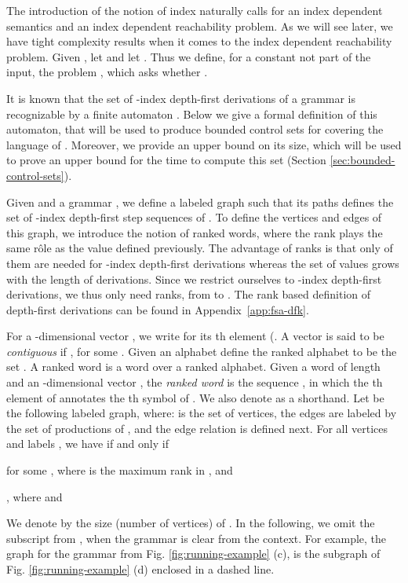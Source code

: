 \documentclass[final]{llncs}
\begin{document}
The introduction of the notion of index naturally calls for an index
dependent semantics and an index dependent reachability problem. As we
will see later, we have tight complexity results when it comes to the
index dependent reachability problem. Given ,
let 
and let . Thus we define, for a constant 
not part of the input, the
problem , which asks
whether .


It is known that the set of -index depth-first derivations of a
grammar  is recognizable by a finite
automaton \cite[Lemma~5]{Luker80}. Below we give a formal definition of this
automaton, that will be used to produce bounded control sets for
covering the language of . Moreover, we provide an upper bound on
its size, which will be used to prove an upper bound for the time
to compute this set (Section \ref{sec:bounded-control-sets}).

Given  and a grammar , we define a
labeled graph  such that its paths defines the set of
-index depth-first step sequences of .  To define the vertices and
edges of this graph, we introduce the notion of ranked words, where the rank
plays the same r\^ole as the value  defined previously. The advantage
of ranks is that only  of them are needed for -index depth-first
derivations whereas the set of  values grows with the length of
derivations. Since we restrict ourselves to -index
depth-first derivations, we thus only need  ranks, from  to .  
The rank based definition of depth-first derivations can be found in
Appendix~\ref{app:fsa-dfk}.

For a -dimensional vector , we
write  for its th element (. A vector  is
said to be \emph{contiguous} if
, 
for some . 
Given an alphabet  define the ranked alphabet  
to be the set .
A ranked word is a word over a ranked alphabet. 
Given a word  of length  and an -dimensional
vector , the \emph{ranked
word}  is the sequence
, 
in which the th element of  annotates the th symbol of . We also denote  as a
shorthand. Let  be the
following labeled graph, where: 
{\setlength\abovedisplayskip{4pt}
\setlength\belowdisplayskip{4pt}
}
is the set of vertices, the edges are labeled by the set  of
productions of , and the edge relation is defined next. For all
vertices  and labels , we
have  if and only if
\begin{compactitem}
\item  for some , where  is the maximum rank in , and 
\item , 
where  and  
\end{compactitem}
We denote
by  the size (number of vertices)
of . In the following, we omit the subscript 
from , when the grammar is clear from the context. For
example, the graph  for the grammar from
Fig. \ref{fig:running-example} (c), is the subgraph of
Fig. \ref{fig:running-example} (d) enclosed in a dashed line.
\end{document}
